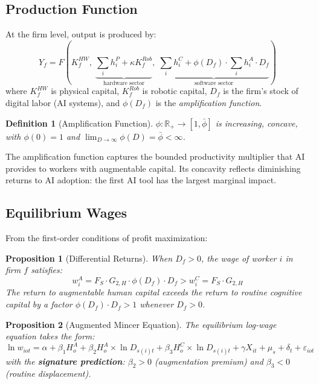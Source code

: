 \documentclass[12pt,a4paper]{article}
\newtheorem{proposition}{Proposition}
\newtheorem{definition}{Definition}
\begin{document}
\subsection{Production Function}

At the firm level, output is produced by:
%
\begin{equation}
Y_f = F\left(K_f^{HW},\; \underbrace{\sum_i h_i^P + \kappa K_f^{Rob}}_{\text{hardware sector}},\; \underbrace{\sum_i h_i^C + \phi(D_f) \cdot \sum_i h_i^A \cdot D_f}_{\text{software sector}}\right)
\label{eq:production}
\end{equation}
%
where $K_f^{HW}$ is physical capital, $K_f^{Rob}$ is robotic capital, $D_f$ is the firm's stock of digital labor (AI systems), and $\phi(D_f)$ is the \textit{amplification function}.

\begin{definition}[Amplification Function]
$\phi: \mathbb{R}_+ \to [1, \bar{\phi}]$ is increasing, concave, with $\phi(0) = 1$ and $\lim_{D \to \infty} \phi(D) = \bar{\phi} < \infty$.
\end{definition}

The amplification function captures the bounded productivity multiplier that AI provides to workers with augmentable capital. Its concavity reflects diminishing returns to AI adoption: the first AI tool has the largest marginal impact.

\subsection{Equilibrium Wages}

From the first-order conditions of profit maximization:

\begin{proposition}[Differential Returns]
\label{prop:returns}
When $D_f > 0$, the wage of worker $i$ in firm $f$ satisfies:
\begin{equation}
w_i^A = F_S \cdot G_{2,H} \cdot \phi(D_f) \cdot D_f > w_i^C = F_S \cdot G_{2,H}
\end{equation}
The return to augmentable human capital exceeds the return to routine cognitive capital by a factor $\phi(D_f) \cdot D_f > 1$ whenever $D_f > 0$.
\end{proposition}

\begin{proposition}[Augmented Mincer Equation]
\label{prop:mincer}
The equilibrium log-wage equation takes the form:
\begin{equation}
\ln w_{iot} = \alpha + \beta_1 H_o^A + \beta_2 H_o^A \times \ln D_{s(i)t} + \beta_3 H_o^C \times \ln D_{s(i)t} + \gamma X_{it} + \mu_s + \delta_t + \varepsilon_{iot}
\label{eq:mincer}
\end{equation}
with the \textbf{signature prediction}: $\beta_2 > 0$ (augmentation premium) and $\beta_3 < 0$ (routine displacement).
\end{proposition}
\end{document}
